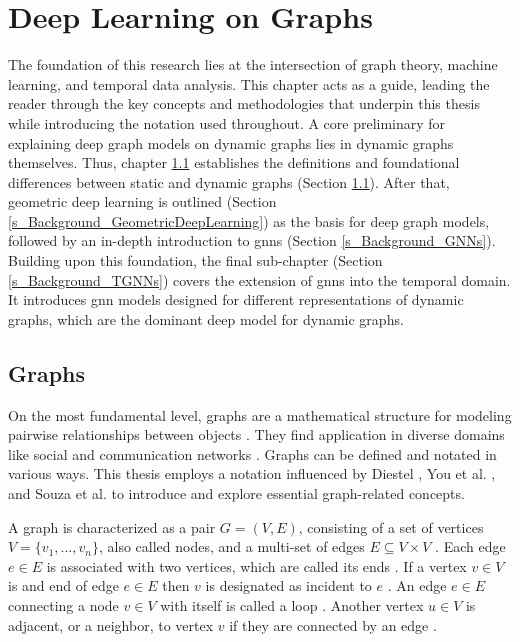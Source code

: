 \section{Deep Learning on Graphs}
\label{s_Background}

The foundation of this research lies at the intersection of graph theory, machine learning, and temporal data analysis. 
This chapter acts as a guide, leading the reader through the key concepts and methodologies that underpin this thesis while introducing the notation used throughout.
A core preliminary for explaining deep graph models on dynamic graphs lies in dynamic graphs themselves. Thus, chapter \ref{s_Background_Graphs} establishes the definitions and foundational differences between static and dynamic graphs (Section \ref{s_Background_Graphs}). After that, geometric deep learning is outlined (Section \ref{s_Background_GeometricDeepLearning}) as the basis for deep graph models, followed by an in-depth introduction to \glspl{gnn} (Section \ref{s_Background_GNNs}). Building upon this foundation, the final sub-chapter (Section \ref{s_Background_TGNNs}) covers the extension of \glspl{gnn} into the temporal domain. It introduces \gls{gnn} models designed for different representations of dynamic graphs, which are the dominant deep model for dynamic graphs.

\subsection{Graphs}
\label{s_Background_Graphs}
On the most fundamental level, graphs are a mathematical structure for modeling pairwise relationships between objects \cite{diestel_graph_2017}. They find application in diverse domains like social and communication networks \cite{bronstein_geometric_2017}. Graphs can be defined and notated in various ways. This thesis employs a notation influenced by Diestel \cite{diestel_graph_2017}, You et al. \cite{you_roland_2022}, and Souza et al. \cite{souza_provably_2022} to introduce and explore essential graph-related concepts.

A graph is characterized as a pair $G = (V, E)$, consisting of a set of vertices $V= \{v_1,...,v_n\}$, also called nodes, and a multi-set of edges $E \subseteq V \times V$ \cite{diestel_graph_2017, you_roland_2022}. Each edge $e \in E$ is associated with two vertices, which are called its ends \cite{diestel_graph_2017}. If a vertex $v \in V$ is and end of edge $e \in E$ then $v$ is designated as incident to $e$ \cite{diestel_graph_2017}. An edge $e \in E$ connecting a node $v \in V$ with itself is called a loop \cite{diestel_graph_2017}. Another vertex $u \in V$ is adjacent, or a neighbor, to vertex $v$ if they are connected by an edge \cite{diestel_graph_2017}. 

